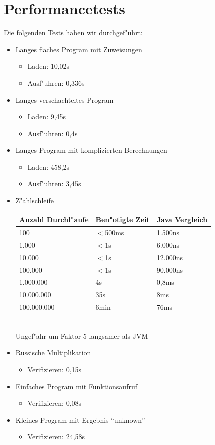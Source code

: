 \documentclass[10pt,a4paper,titlepage]{article}
\begin{document}
\section{Performancetests}
Die folgenden Tests haben wir durchgef"uhrt:
\begin{itemize}
\item Langes flaches Program mit Zuweisungen
\begin{itemize}
\item Laden: 10,02s
\item Ausf"uhren: 0,336s
\end{itemize}
\item Langes verschachteltes Program
\begin{itemize}
\item Laden: 9,45s
\item Ausf"uhren: 0,4s
\end{itemize}
\item Langes Program mit komplizierten Berechnungen
\begin{itemize}
\item Laden: 458,2s
\item Ausf"uhren: 3,45s
\end{itemize}
\item Z"ahlschleife \\[0.2cm]
\begin{tabular}{|p{3cm}|p{3cm}|p{3cm}|}
\hline
Anzahl Durchl"aufe&Ben"otigte Zeit&Java Vergleich \\\hline
100&$<$500ms&1.500ns\\\hline
1.000&$<$1s&6.000ns\\\hline
10.000&$<$1s&12.000ns\\\hline
100.000&$<$1s&90.000ns\\\hline
1.000.000&4s&0,8ms\\\hline
10.000.000&35s&8ms\\\hline
100.000.000&6min&76ms\\\hline
\end{tabular}
\\[0.2cm]
Ungef"ahr um Faktor 5 langsamer als JVM
\item Russische Multiplikation
\begin{itemize}
\item Verifizieren: 0,15s
\end{itemize}
\item Einfaches Program mit Funktionsaufruf
\begin{itemize}
\item Verifizieren: 0,08s
\end{itemize}
\item Kleines Program mit Ergebnis "`unknown"'
\begin{itemize}
\item Verifizieren: 24,58s
\end{itemize}
\end{itemize}


\end{document}
